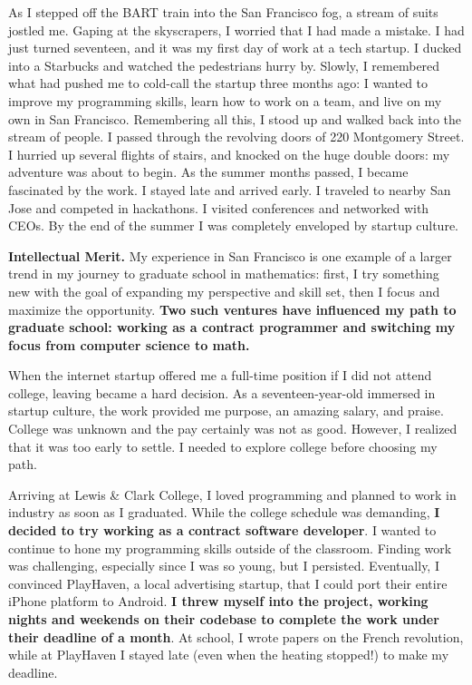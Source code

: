 \documentclass[12pt]{article}
\title{}
\begin{document}
As I stepped off the BART train into the San Francisco fog, a stream of suits jostled me. Gaping at the skyscrapers, I worried that I had made a mistake. I had just turned seventeen, and it was my first day of work at a tech startup. I ducked into a Starbucks and watched the pedestrians hurry by. Slowly, I remembered what had pushed me to cold-call the startup three months ago: I wanted to improve my programming skills, learn how to work on a team, and live on my own in San Francisco. Remembering all this, I stood up  and walked back into the stream of people. I passed through the revolving doors of 220 Montgomery Street. I hurried up several flights of stairs, and knocked on the huge double doors: my adventure was about to begin. As the summer months passed, I became fascinated by the work. I stayed late and arrived early. I traveled to nearby San Jose and competed in hackathons. I visited conferences and networked with CEOs. By the end of the summer I was completely enveloped by startup culture.

\textbf{Intellectual Merit.} My experience in San Francisco is one example of a larger trend in my journey to graduate school in mathematics: first, I try something new with the goal of expanding my perspective and skill set, then I focus and maximize the opportunity. \textbf{Two such ventures have influenced my path to graduate school: working as a contract programmer and switching my focus from computer science to math.}

When the internet startup offered me a full-time position if I did not attend college, leaving became a hard decision. As a seventeen-year-old immersed in startup culture, the work provided me purpose, an amazing salary, and praise. College was unknown and the pay certainly was not as good. However, I realized that it was too early to settle. I needed to explore college before choosing my path.

Arriving at Lewis \& Clark College, I loved programming and planned to work in industry as soon as I graduated. While the college schedule was demanding, \textbf{I decided to try working as a contract software developer}. I wanted to continue to hone my programming skills outside of the classroom. Finding work was challenging, especially since I was so young, but I persisted. Eventually, I convinced PlayHaven, a local advertising startup, that I could port their entire iPhone platform to Android. \textbf{I threw myself into the project, working nights and weekends on their codebase to complete the work under their deadline of a month}. At school, I wrote papers on the French revolution, while at PlayHaven I stayed late (even when the heating stopped!) to make my deadline.
\end{document}
